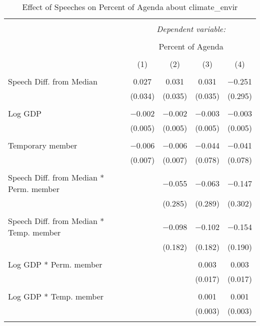 
\begin{table}[!htbp] \centering 
  \caption{Effect of Speeches on Percent of Agenda about climate_envir} 
  \label{} 
\begin{tabular}{@{\extracolsep{5pt}}lcccc} 
\\[-1.8ex]\hline 
\hline \\[-1.8ex] 
 & \multicolumn{4}{c}{\textit{Dependent variable:}} \\ 
\cline{2-5} 
\\[-1.8ex] & \multicolumn{4}{c}{Percent of Agenda} \\ 
\\[-1.8ex] & (1) & (2) & (3) & (4)\\ 
\hline \\[-1.8ex] 
 Speech Diff. from Median & 0.027 & 0.031 & 0.031 & $-$0.251 \\ 
  & (0.034) & (0.035) & (0.035) & (0.295) \\ 
  & & & & \\ 
 Log GDP & $-$0.002 & $-$0.002 & $-$0.003 & $-$0.003 \\ 
  & (0.005) & (0.005) & (0.005) & (0.005) \\ 
  & & & & \\ 
 Temporary member & $-$0.006 & $-$0.006 & $-$0.044 & $-$0.041 \\ 
  & (0.007) & (0.007) & (0.078) & (0.078) \\ 
  & & & & \\ 
 Speech Diff. from Median * Perm. member &  & $-$0.055 & $-$0.063 & $-$0.147 \\ 
  &  & (0.285) & (0.289) & (0.302) \\ 
  & & & & \\ 
 Speech Diff. from Median * Temp. member &  & $-$0.098 & $-$0.102 & $-$0.154 \\ 
  &  & (0.182) & (0.182) & (0.190) \\ 
  & & & & \\ 
 Log GDP * Perm. member &  &  & 0.003 & 0.003 \\ 
  &  &  & (0.017) & (0.017) \\ 
  & & & & \\ 
 Log GDP * Temp. member &  &  & 0.001 & 0.001 \\ 
  &  &  & (0.003) & (0.003) \\ 
  & & & & \\ 

\end{tabular}
\end{table}
